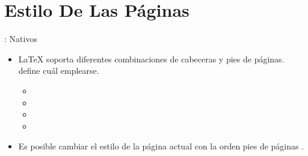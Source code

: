 \documentclass{beamer}
\subtitle{Parte 4: Adaptando el documento a nuestras necesidades}
\begin{document}
\begin{frame}
  \titlepage
\end{frame}

\section{Estilo De Las Páginas}

\begin{frame}[fragile]{\insertsection: Nativos}
  \begin{itemize}
  \item \LaTeX{} soporta diferentes combinaciones de cabeceras y
    pies de páginas.  define cuál emplearse.
    \begin{itemize}
    \item {}
    \item {}
    \item {}      
    \item {}      
    \end{itemize}
  \item Es posible cambiar el estilo de la página actual con la orden
    pies de páginas .
  \end{itemize}
\end{frame}
\end{document}
